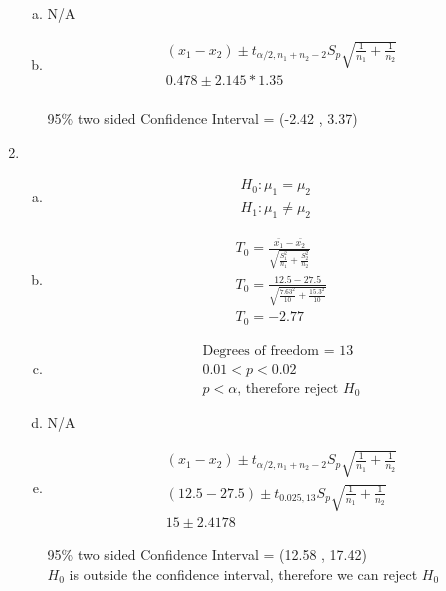 \documentclass[14pt]{article}
\begin{document}
\begin{enumerate}
\begin{enumerate}[(a)]
\item
N/A

\item
\begin{align*}
& (x_1 - x_2) \pm t_{\alpha / 2, n_1 + n_2 -2} S_p \sqrt{\frac{1}{n_1} + \frac{1}{n_2}} \\[15pt]
& 0.478 \pm 2.145 * 1.35 \\[15pt]
\end{align*}

95\% two sided Confidence Interval = (-2.42 , 3.37)

\end{enumerate}

\item

\begin{enumerate}[(a)]
\item
\begin{align*}
H_0: \mu_1 = \mu_2 \\[15pt]
H_1: \mu_1 \neq \mu_2
\end{align*}

\item
\begin{align*}
& T_0 = \frac{\bar{x_1} - \bar{x_2}}{\sqrt{\frac{S_1^2}{n_1} + \frac{S_2^2}{n_2}}} \\[15pt]
& T_0 = \frac{12.5 - 27.5}{\sqrt{\frac{7.63^2}{10} + \frac{15.3^2}{10}}} \\[15pt]
& T_0 = -2.77
\end{align*}

\item
\begin{align*}
& \text{Degrees of freedom = } 13 \\[15pt]
& 0.01 < p < 0.02 \\[15pt]
& p < \alpha \text{, therefore reject } H_0 
\end{align*}

\item
N/A

\item
\begin{align*}
& (x_1 - x_2) \pm t_{\alpha / 2, n_1 + n_2 -2} S_p \sqrt{\frac{1}{n_1} + \frac{1}{n_2}} \\[15pt]
& (12.5 - 27.5) \pm t_{0.025,13} S_p \sqrt{\frac{1}{n_1} + \frac{1}{n_2}} \\[15pt]
& 15 \pm 2.4178 
\end{align*}

95\% two sided Confidence Interval = (12.58 , 17.42) \\
$H_0$ is outside the confidence interval, therefore we can reject $H_0$


\end{enumerate}
\end{enumerate}
\end{document}

